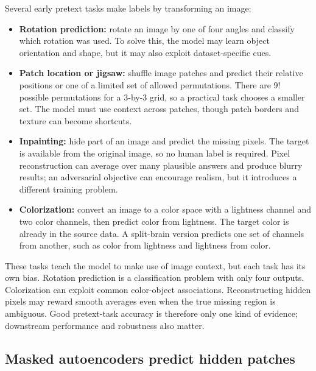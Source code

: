\hypertarget{04-visual-computing-ii-ch031-transformation-and-reconstruction-pretext-tasks}{}

Several early pretext tasks make labels by transforming an image:

\begin{itemize}
\tightlist
\item
  \textbf{Rotation prediction:} rotate an image by one of four angles and classify which rotation was used. To solve this, the model may learn object orientation and shape, but it may also exploit dataset-specific cues.
\item
  \textbf{Patch location or jigsaw:} shuffle image patches and predict their relative positions or one of a limited set of allowed permutations. There are \(9!\) possible permutations for a 3-by-3 grid, so a practical task chooses a smaller set. The model must use context across patches, though patch borders and texture can become shortcuts.
\item
  \textbf{Inpainting:} hide part of an image and predict the missing pixels. The target is available from the original image, so no human label is required. Pixel reconstruction can average over many plausible answers and produce blurry results; an adversarial objective can encourage realism, but it introduces a different training problem.
\item
  \textbf{Colorization:} convert an image to a color space with a lightness channel and two color channels, then predict color from lightness. The target color is already in the source data. A split-brain version predicts one set of channels from another, such as color from lightness and lightness from color.
\end{itemize}

These tasks teach the model to make use of image context, but each task has its own bias. Rotation prediction is a classification problem with only four outputs. Colorization can exploit common color-object associations. Reconstructing hidden pixels may reward smooth averages even when the true missing region is ambiguous. Good pretext-task accuracy is therefore only one kind of evidence; downstream performance and robustness also matter.

\subsection{Masked autoencoders predict hidden patches}\label{04-visual-computing-ii-ch031-masked-autoencoders-predict-hidden-patches}

